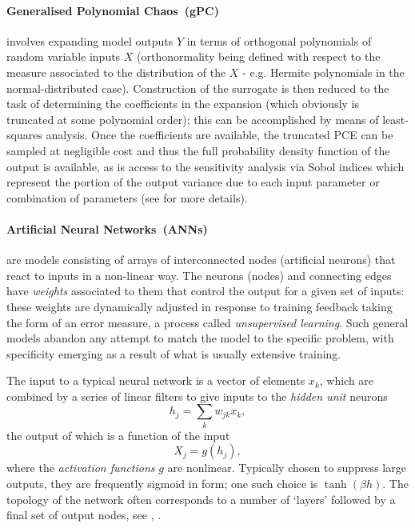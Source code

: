\paragraph{Generalised Polynomial Chaos~(gPC)} involves expanding model outputs $Y$ in terms of orthogonal polynomials of 
random variable inputs $X$ (orthonormality being defined with respect to the measure associated to 
the distribution of the $X$ - e.g. Hermite polynomials in the normal-distributed case).  
Construction of the surrogate is then reduced to the task of determining the coefficients in the expansion 
(which obviously is truncated at some polynomial order); this can be accomplished by means of 
least-squares analysis.  
Once the coefficients are available, the truncated PCE can be sampled at negligible cost and thus 
the full probability density function of the output is available, as is access to the sensitivity analysis via Sobol indices 
which represent the portion of the output variance due to each input parameter or combination of 
parameters (see  for more details).  

\paragraph{Artificial Neural Networks~(ANNs)} are models consisting of arrays of 
interconnected nodes (artificial neurons) that react to inputs in a non-linear way.  
The neurons (nodes) and connecting edges have {\it weights} associated to them that control the 
output for a given set of inputs: these weights are dynamically adjusted in response to training 
feedback taking the form of an error measure, a process called {\it unsupervised learning}.  
Such general models abandon any attempt to match the model to the specific problem, with 
specificity emerging as a result of what is usually extensive training.

The input to a typical neural network is a vector of elements ${x_k}$, which are combined by a 
series of linear filters to give inputs to the {\it hidden unit} neurons
\begin{equation}
h_j = \sum_k w_{jk} x_k,
\end{equation}
the output of which is a function of the input
\begin{equation}
X_j = g(h_j),
\end{equation}
where the {\it activation functions} $g$ are nonlinear.  
Typically chosen to suppress large outputs, they are frequently sigmoid in form; one such choice is 
$\tanh(\beta h)$.  
The topology of the network often corresponds to a number of `layers' followed by a final set of 
output nodes, see \cite{gershenfeld}, \cite[\S\,6.7]{bruntonkutz}.

